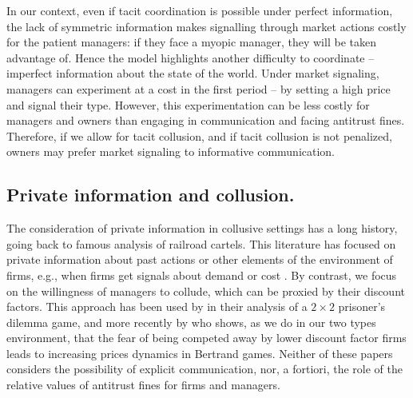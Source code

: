 \documentclass[]{article}
\begin{document}
In our context, even if tacit coordination is possible under perfect information, the lack of symmetric information makes signalling through market actions costly for the patient managers: if they face a myopic manager, they will be taken advantage of. Hence the model highlights another difficulty to coordinate -- imperfect information about the state of the world. Under market signaling, managers can experiment at a cost in the first period -- by setting a high price and signal their type. However, this experimentation can be less costly for managers and owners than engaging in communication and facing antitrust fines. Therefore, if we allow for tacit collusion, and if tacit collusion is not penalized, owners may prefer market signaling to informative communication.

\subsection{Private information and collusion.}
The consideration of private information in collusive settings has a long history, going back to \cite{green-porter1983} famous analysis of railroad cartels. This literature has focused on private information about past actions or other elements of the environment of firms, e.g., when firms get signals about demand or cost \citep{Athey2001}. By contrast, we focus on the willingness of managers to collude, which can be proxied by their discount factors. This approach has been used by  \cite{Harrington-Zhao2012} in their analysis of a $2\times2$ prisoner's dilemma game, and more recently by \cite{lefez2017} who shows, as we do in our two types environment, that the fear of being competed away by lower discount factor firms leads to increasing prices dynamics in Bertrand games. Neither of these papers considers the possibility of explicit communication, nor, a fortiori, the role of the relative values of antitrust fines for firms and managers.
%
\end{document}
